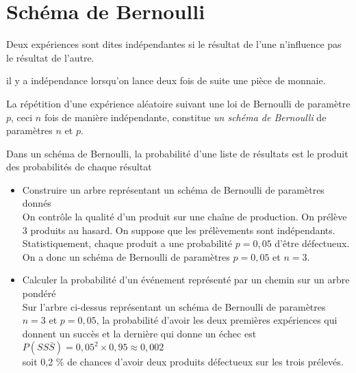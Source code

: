 \documentclass[french]{book}
\begin{document}
\section{Schéma de Bernoulli}


\begin{defn}
Deux expériences sont dites indépendantes si le résultat de l'une n'influence pas le résultat de l'autre.
\end{defn}


\begin{exemple}
il y a indépendance lorsqu'on lance deux fois de suite une pièce de monnaie.
\end{exemple}


\begin{defn}
La répétition d'une expérience aléatoire suivant une loi de Bernoulli de paramètre $p$, ceci $n$ fois de manière indépendante, constitue \emph{un schéma de Bernoulli} de paramètres $n$ et $p$.
\end{defn}


\begin{prop}
Dans un schéma de Bernoulli, la probabilité d'une liste de résultats est le produit des probabilités de chaque résultat
\end{prop}


\begin{exemple}
\begin{itemize}
\item[$\bullet$] Construire un arbre représentant un schéma de Bernoulli de paramètres donnés\\
On contrôle la qualité d'un produit sur une chaîne de production. On prélève 3 produits au hasard. On suppose que les prélèvements sont indépendants. Statistiquement, chaque produit a une probabilité $p=0,05$ d'être défectueux.\\
On a donc un schéma de Bernoulli de paramètres $p=0,05$ et $n=3$.\\

\item[$\bullet$] Calculer la probabilité d'un événement représenté par un chemin sur un arbre pondéré\\

Sur l'arbre ci-dessus représentant un schéma de Bernoulli de paramètres $n=3$ et $p=0,05$, la probabilité d'avoir les deux premières expériences qui donnent un succès et la dernière qui donne un échec est $P(SS\bar{S})=0,05^2\times 0,95\approx 0,002$\\

soit 0,2 \% de chances d'avoir deux produits défectueux sur les trois prélevés.
\end{itemize}
\end{exemple}
\end{document}
